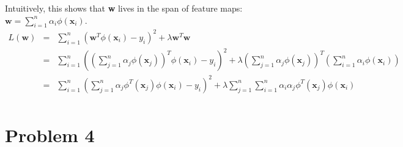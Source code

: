 \documentclass[12pt]{article}
\begin{document}
Intuitively, this shows that \textbf{w} lives in the span of feature maps: $\textbf{w} = \sum_{i=1}^n \alpha_i \phi(\textbf{x}_i)$. \\

\begin{eqnarray*}
  L(\textbf{w})
  &=& \sum_{i=1}^n \left(\textbf{w}^T \phi(\textbf{x}_i) - y_i \right)^2
  + \lambda \textbf{w}^T \textbf{w} \\
  &=& \sum_{i=1}^n \left(
    \left( \sum_{j=1}^n \alpha_j \phi(\textbf{x}_j) \right)^T 
    \phi(\textbf{x}_i) - y_i \right)^2
  + \lambda \left( \sum_{j=1}^n \alpha_j \phi(\textbf{x}_j) \right)^T
  \left( \sum_{i=1}^n \alpha_i \phi(\textbf{x}_i) \right) \\
  &=& \sum_{i=1}^n \left( \sum_{j=1}^n \alpha_j \phi^T(\textbf{x}_j)
    \phi(\textbf{x}_i) - y_i \right)^2
  + \lambda \sum_{j=1}^n \sum_{i=1}^n \alpha_i \alpha_j 
  \phi^T(\textbf{x}_j) \phi(\textbf{x}_i) \\
\end{eqnarray*}

\section*{Problem 4}
\end{document}
